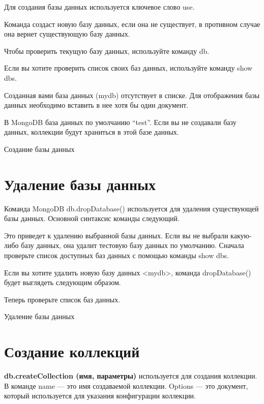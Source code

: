 Для создания базы данных используется ключевое слово use.\par
Команда создаст новую базу данных, если она не существует, в противном
случае она вернет существующую базу данных.\par
Чтобы проверить текущую базу данных, используйте команду db.\par
Если вы хотите проверить список своих баз данных, используйте
команду show dbs.\par
Созданная вами база данных (mydb) отсутствует в списке. Для
отображения базы данных необходимо вставить в нее хотя бы один документ.\par
В MongoDB база данных по умолчанию “test”. Если вы не создавали базу
данных, коллекции будут храниться в этой базе данных.\par

\begin{image}
	\caption{Создание базы данных}
	\label{fig:create:db}
\end{image}

\clearpage
\section{Удаление базы данных}

Команда MongoDB db.dropDatabase() используется для удаления
существующей базы данных. Основной синтаксис команды следующий.\par
Это приведет к удалению выбранной базы данных. Если вы не выбрали
какую-либо базу данных, она удалит тестовую базу данных по умолчанию.
Сначала проверьте список доступных баз данных с помощью
команды show dbs.\par
Если вы хотите удалить новую базу данных <mydb>, команда
dropDatabase() будет выглядеть следующим образом.\par
Теперь проверьте список баз данных.

\begin{image}
	\caption{Удаление базы данных}
	\label{fig:drop:db}
\end{image}

\clearpage
\section{Создание коллекций}

\textbf{db.createCollection (имя, параметры)} используется для создания
коллекции.
В команде name --- это имя создаваемой коллекции. Options — это
документ, который используется для указания конфигурации коллекции.

